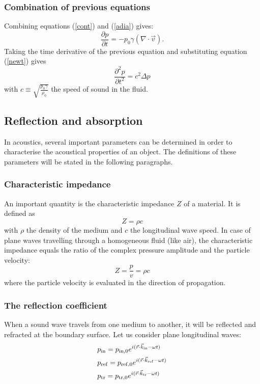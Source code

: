 \subsubsection*{Combination of previous equations}
Combining equations (\ref{cont}) and (\ref{adia}) gives:
\begin{equation}
\frac{\partial p}{\partial t} = - p_0 \gamma \left(\nabla \cdot \vec{v}\right).
\label{dpdt}
\end{equation}
Taking the time derivative of the previous equation and substituting equation (\ref{newt}) gives
\[
\frac{\partial^2 p}{\partial t^2} =  c^2 \Delta p
\]
with $c\equiv \sqrt{\frac{p_0 \gamma}{\rho_0}}$ the speed of sound in the fluid.







\subsection{Reflection and absorption}
In acoustics, several important parameters can be determined in order to characterise the acoustical properties of an object. The  definitions of these parameters will be stated in the following paragraphs.


\subsubsection*{Characteristic impedance}
An important quantity is the characteristic impedance $Z$ of a material. It is defined as 
\[
Z = \rho c
\]
with $\rho$ the density of the medium and $c$ the longitudinal wave speed. In case of plane waves travelling through a homogeneous fluid (like air), the characteristic impedance equals the ratio of the complex pressure amplitude and the particle velocity:
\[
Z = \frac{p}{v} = \rho c
\]
where the particle velocity is evaluated in the direction of propagation.


\subsubsection*{The reflection coefficient}
When a sound wave travels from one medium to another, it will be reflected and refracted at the boundary surface. Let us consider plane longitudinal waves:
\begin{align*}
&p_\mathrm{in} = p_\mathrm{in, 0} e^{i (\vec{r} \cdot \vec{k}_\mathrm{in} -  \omega t)}\\
&p_\mathrm{ref} = p_\mathrm{ref, 0} e^{i (\vec{r} \cdot \vec{k}_\mathrm{ref} -  \omega t)}\\
&p_\mathrm{tr} = p_\mathrm{tr, 0} e^{i (\vec{r} \cdot \vec{k}_\mathrm{tr} -  \omega t)}\\
\end{align*}

